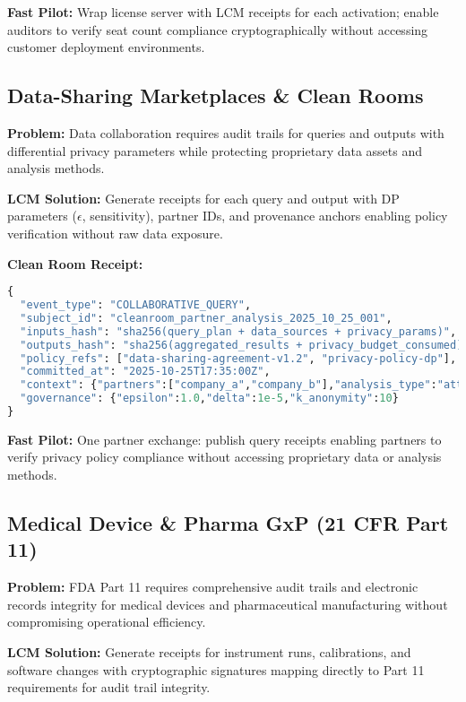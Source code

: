 \documentclass[12pt,a4paper]{article}
\begin{document}
\textbf{Fast Pilot:} Wrap license server with LCM receipts for each activation; enable auditors to verify seat count compliance cryptographically without accessing customer deployment environments.

\subsection{Data-Sharing Marketplaces \& Clean Rooms}

\textbf{Problem:} Data collaboration requires audit trails for queries and outputs with differential privacy parameters while protecting proprietary data assets and analysis methods.

\textbf{LCM Solution:} Generate receipts for each query and output with DP parameters ($\epsilon$, sensitivity), partner IDs, and provenance anchors enabling policy verification without raw data exposure.

\begin{technicalbox}
\textbf{Clean Room Receipt:}
\begin{lstlisting}[language=Python, caption=Data Collaboration Receipt]
{
  "event_type": "COLLABORATIVE_QUERY",
  "subject_id": "cleanroom_partner_analysis_2025_10_25_001",
  "inputs_hash": "sha256(query_plan + data_sources + privacy_params)",
  "outputs_hash": "sha256(aggregated_results + privacy_budget_consumed)",
  "policy_refs": ["data-sharing-agreement-v1.2", "privacy-policy-dp"],
  "committed_at": "2025-10-25T17:35:00Z",
  "context": {"partners":["company_a","company_b"],"analysis_type":"attribution"},
  "governance": {"epsilon":1.0,"delta":1e-5,"k_anonymity":10}
}
\end{lstlisting}
\end{technicalbox}

\textbf{Fast Pilot:} One partner exchange: publish query receipts enabling partners to verify privacy policy compliance without accessing proprietary data or analysis methods.

\subsection{Medical Device \& Pharma GxP (21 CFR Part 11)}

\textbf{Problem:} FDA Part 11 requires comprehensive audit trails and electronic records integrity for medical devices and pharmaceutical manufacturing without compromising operational efficiency.

\textbf{LCM Solution:} Generate receipts for instrument runs, calibrations, and software changes with cryptographic signatures mapping directly to Part 11 requirements for audit trail integrity.
\end{document}
